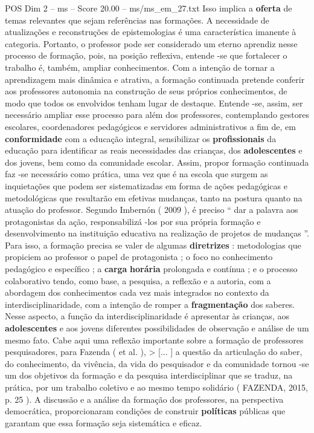 \begin{textsample}{POS Dim 2 – ms – Score 20.00 – ms/ms\_em\_27.txt}
Isso implica a \textbf{oferta} de temas relevantes que sejam referências nas formações.
A necessidade de atualizações e reconstruções de epistemologias é uma característica imanente à categoria.
Portanto, o professor pode ser considerado um eterno aprendiz nesse processo de formação, pois, na posição reflexiva, entende -se que fortalecer o trabalho é, também, ampliar conhecimentos.
Com a intenção de tornar a aprendizagem mais dinâmica e atrativa, a formação continuada pretende conferir aos professores autonomia na construção de seus próprios conhecimentos, de modo que todos os envolvidos tenham lugar de destaque.
Entende -se, assim, ser necessário ampliar esse processo para além dos professores, contemplando gestores escolares, coordenadores pedagógicos e servidores administrativos a fim de, em \textbf{conformidade} com a educação integral, sensibilizar os \textbf{profissionais} da educação para identificar as reais necessidades das crianças, dos \textbf{adolescentes} e dos jovens, bem como da comunidade escolar.
Assim, propor formação continuada faz -se necessário como prática, uma vez que é na escola que surgem as inquietações que podem ser sistematizadas em forma de ações pedagógicas e metodológicas que resultarão em efetivas mudanças, tanto na postura quanto na atuação do professor.
Segundo Imbernón ( 2009 ), é preciso “ dar a palavra aos protagonistas da ação, responsabilizá -los por sua própria formação e desenvolvimento na instituição educativa na realização de projetos de mudanças ”.
Para isso, a formação precisa se valer de algumas \textbf{diretrizes} : metodologias que propiciem ao professor o papel de protagonista ; o foco no conhecimento pedagógico e específico ; a \textbf{carga} \textbf{horária} prolongada e contínua ; e o processo colaborativo tendo, como base, a pesquisa, a reflexão e a autoria, com a abordagem dos conhecimentos cada vez mais integrados no contexto da interdisciplinaridade, com a intenção de romper a \textbf{fragmentação} dos saberes.
Nesse aspecto, a função da interdisciplinaridade é apresentar às crianças, aos \textbf{adolescentes} e aos jovens diferentes possibilidades de observação e análise de um mesmo fato.
Cabe aqui uma reflexão importante sobre a formação de professores pesquisadores, para Fazenda ( et al. ), > [... ] a questão da articulação do saber, do conhecimento, da vivência, da vida do pesquisador e da comunidade tornou -se um dos objetivos da formação e da pesquisa interdisciplinar que se traduz, na prática, por um trabalho coletivo e ao mesmo tempo solidário ( FAZENDA, 2015, p. 25 ).
A discussão e a análise da formação dos professores, na perspectiva democrática, proporcionaram condições de construir \textbf{políticas} públicas que garantam que essa formação seja sistemática e eficaz.

\end{textsample}
